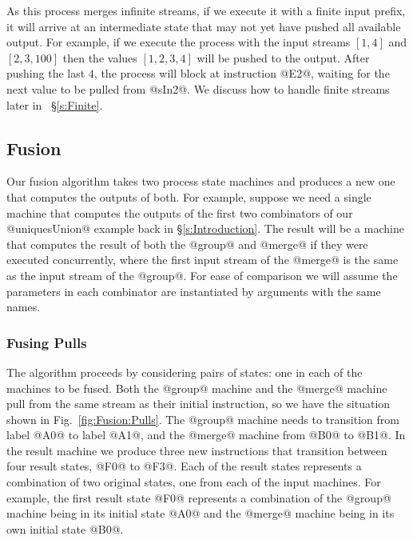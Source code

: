 As this process merges infinite streams, if we execute it with a finite input prefix, it will arrive at an intermediate state that may not yet have pushed all available output. For example, if we execute the process with the input streams $[1, 4]$ and $[2, 3, 100]$ then the values $[1, 2, 3, 4]$ will be pushed to the output.
After pushing the last $4$, the process will block at instruction @E2@, waiting for the next value to be pulled from @sIn2@. We discuss how to handle finite streams later in ~\S\ref{s:Finite}.


\subsection{Fusion}
Our fusion algorithm takes two process state machines and produces a new one that computes the outputs of both. For example, suppose we need a single machine that computes the outputs of the first two combinators of our @uniquesUnion@ example back in \S\ref{s:Introduction}. The result will be a machine that computes the result of both the @group@ and @merge@ if they were executed concurrently, where the first input stream of the @merge@ is the same as the input stream of the @group@. For ease of comparison we will assume the parameters in each combinator are instantiated by arguments with the same names.


\subsubsection{Fusing Pulls}

The algorithm proceeds by considering pairs of states: one in each of the machines to be fused. Both the @group@ machine and the @merge@ machine pull from the same stream as their initial instruction, so we have the situation shown in Fig.~\ref{fig:Fusion:Pulls}. The @group@ machine needs to transition from label @A0@ to label @A1@, and the @merge@ machine from @B0@ to @B1@. In the result machine we produce three new instructions that transition between four result states, @F0@ to @F3@.
Each of the result states represents a combination of two original states, one from each of the input machines. For example, the first result state @F0@ represents a combination of the @group@ machine being in its initial state @A0@ and the @merge@ machine being in its own initial state @B0@. 

